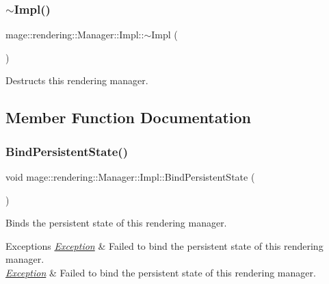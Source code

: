 \subsubsection{\texorpdfstring{$\sim$\+Impl()}{~Impl()}}
{\footnotesize\ttfamily mage\+::rendering\+::\+Manager\+::\+Impl\+::$\sim$\+Impl (\begin{DoxyParamCaption}{ }\end{DoxyParamCaption})}

Destructs this rendering manager. 

\subsection{Member Function Documentation}
\mbox{\label{classmage_1_1rendering_1_1_manager_1_1_impl_a0ffe370f901194395d73f641f72313d6}} 
\subsubsection{\texorpdfstring{Bind\+Persistent\+State()}{BindPersistentState()}}
{\footnotesize\ttfamily void mage\+::rendering\+::\+Manager\+::\+Impl\+::\+Bind\+Persistent\+State (\begin{DoxyParamCaption}{ }\end{DoxyParamCaption})}

Binds the persistent state of this rendering manager.


\begin{DoxyExceptions}{Exceptions}
{\em \mbox{\hyperlink{classmage_1_1_exception}{Exception}}} & Failed to bind the persistent state of this rendering manager. \\
\hline
{\em \mbox{\hyperlink{classmage_1_1_exception}{Exception}}} & Failed to bind the persistent state of this rendering manager. \\
\hline
\end{DoxyExceptions}
\mbox{\label{classmage_1_1rendering_1_1_manager_1_1_impl_a413668c5240857bf38197fc8a700ceab}} 
